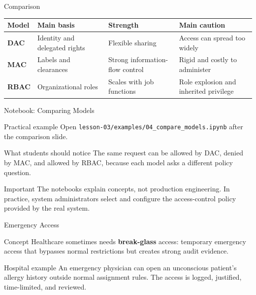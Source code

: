 \documentclass[presentation]{beamer}
\begin{document}
\begin{frame}[c]{Comparison}
\begin{center}
\scriptsize
\renewcommand{\arraystretch}{1.25}
\begin{tabular}{@{}>{\bfseries}p{} p{} p{} p{}@{}}
\toprule
Model & Main basis & Strength & Main caution \\
\midrule
DAC & Identity and delegated rights & Flexible sharing & Access can spread too widely \\
MAC & Labels and clearances & Strong information-flow control & Rigid and costly to administer \\
RBAC & Organizational roles & Scales with job functions & Role explosion and inherited privilege \\
\bottomrule
\end{tabular}
\end{center}
\end{frame}

\begin{frame}[c]{Notebook: Comparing Models}
\begin{block}{Practical example}
Open \texttt{lesson-03/examples/04\_compare\_models.ipynb} after the comparison slide.
\end{block}

\begin{exampleblock}{What students should notice}
The same request can be allowed by DAC, denied by MAC, and allowed by RBAC, because each model asks
a different policy question.
\end{exampleblock}

\begin{block}{Important}
The notebooks explain concepts, not production engineering. In practice, system administrators
select and configure the access-control policy provided by the real system.
\end{block}
\end{frame}

\begin{frame}[c]{Emergency Access}
\begin{block}{Concept}
Healthcare sometimes needs \textbf{break-glass} access: temporary emergency access that bypasses
normal restrictions but creates strong audit evidence.
\end{block}

\begin{exampleblock}{Hospital example}
An emergency physician can open an unconscious patient's allergy history outside normal assignment
rules. The access is logged, justified, time-limited, and reviewed.
\end{exampleblock}
\end{frame}
\end{document}
